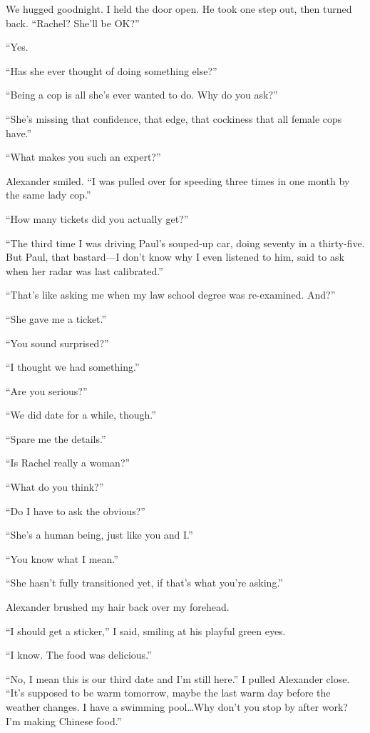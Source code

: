 We hugged goodnight. I held the door open. He took one step out, then
turned back. ``Rachel? She'll be OK?''

``Yes.

``Has she ever thought of doing something else?''

``Being a cop is all she's ever wanted to do. Why do you ask?''

``She's missing that confidence, that edge, that cockiness that all
female cops have.''

``What makes you such an expert?''

Alexander smiled. ``I was pulled over for speeding three times in one
month by the same lady cop.''

``How many tickets did you actually get?''

``The third time I was driving Paul's souped-up car, doing seventy in a
thirty-five. But Paul, that bastard---I don't know why I even listened
to him, said to ask when her radar was last calibrated.''

``That's like asking me when my law school degree was re-examined.
And?''

``She gave me a ticket.''

``You sound surprised?''

``I thought we had something.''

``Are you serious?''

``We did date for a while, though.''

``Spare me the details.''

``Is Rachel really a woman?''

``What do you think?''

``Do I have to ask the obvious?''

``She's a human being, just like you and I.''

``You know what I mean.''

``She hasn't fully transitioned yet, if that's what you're asking.''

Alexander brushed my hair back over my forehead.

``I should get a sticker,'' I said, smiling at his playful green eyes.

``I know. The food was delicious.''

``No, I mean this is our third date and I'm still here.'' I pulled
Alexander close. ``It's supposed to be warm tomorrow, maybe the last
warm day before the weather changes. I have a swimming pool\ldots Why
don't you stop by after work? I'm making Chinese food.''

